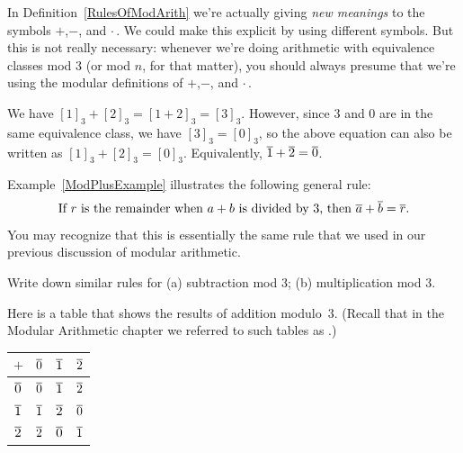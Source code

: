 In Definition~\ref{RulesOfModArith} we're actually giving \emph{new meanings} to the symbols $+$,$-$, and $\cdot$\,. We could make this explicit by using different symbols. But this is not really necessary: whenever we're doing arithmetic with equivalence classes mod 3 (or mod $n$, for that matter), you should always presume that we're using the modular definitions of $+$,$-$, and $\cdot$\,.

\begin{eg}\label{ModPlusExample}
We have $[1]_3 + [2]_3 = [1 + 2]_3 = [3]_3$. However, since 3 and 0 are in the same equivalence class, we have $[3]_3 = [0]_3$, so the above equation can also be written as $[1]_3 + [2]_3 = [0]_3$. Equivalently, $\overline{1} + \overline{2} = \overline{0}$.
\end{eg}

Example~\ref{ModPlusExample} illustrates the following general rule:
$$ \text{%
 If $r$ is the remainder when $a + b$ is divided by $3$, then $\class{a} + \class{b} = \class{r}$.} $$
You may recognize that this is essentially the same rule that we used in our previous discussion of modular arithmetic.

\begin{exercise}{47}
Write down similar rules for (a) subtraction mod 3; (b) multiplication mod 3.
\end{exercise}

\begin{eg}
Here is a table that shows the results of addition modulo~$3$. (Recall that in the Modular Arithmetic chapter we referred to such tables as .)
\begin{center} \begin{tabular}{c|c c c}
$+$&$\overline{0}$&$\overline{1}$&$\overline{2}$\\ \hline
$\overline{0}$&$\overline{0}$&$\overline{1}$&$\overline{2}$ \\
$\overline{1}$&$\overline{1}$&$\overline{2}$&$\overline{0}$ \\
$\overline{2}$&$\overline{2}$&$\overline{0}$&$\overline{1}$ \\
\end{tabular}
\end{center}
\end{eg}


